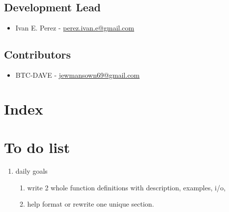\documentclass[refman]{article}
\begin{document}
 \subsection{Development Lead}
 \begin{itemize}
 	\item Ivan E. Perez -  \href{mailto:perez.ivan.e@gmail.com}{perez.ivan.e@gmail.com}
 \end{itemize}
 \subsection{Contributors}
 \begin{itemize}
 	\item BTC-DAVE - \href{mailto:jewmansown69@gmail.com}{jewmansown69@gmail.com}
 \end{itemize}
 \newpage
 
 



 \section{Index}
 \section{To do list}
 \begin{enumerate}
 	\item daily goals
 	\begin{enumerate}
 		\item write 2 whole function definitions with description, examples, i/o, 
 		\item help format or rewrite one unique section. 
 	\end{enumerate}
 \end{enumerate}

	
\end{document}
